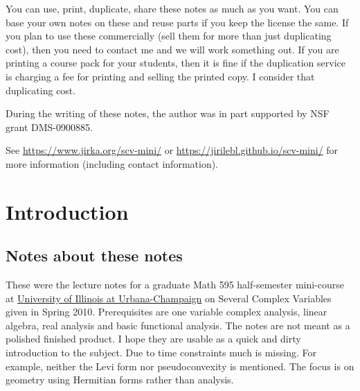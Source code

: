 \documentclass[12pt,openany]{book}
\theoremstyle{plain}
\theoremstyle{remark}
\theoremstyle{definition}
\theoremstyle{exercise}
\theoremstyle{example}
\begin{document}
\noindent
You can use, print, duplicate, share these notes as much as you want.  You can
base your own notes on these and reuse parts if you keep the license the
same.  If you plan to use these commercially (sell them for more than just
duplicating cost), then you need to contact me and we will work something out.
If you are printing a course pack for your students, then it is fine if the 
duplication service is charging a fee for printing and selling the printed
copy.  I consider that duplicating cost.

\bigskip

\noindent
During the writing of these notes, 
the author was in part supported by NSF grant DMS-0900885.

\bigskip

\noindent
See
\url{https://www.jirka.org/scv-mini/} or
\url{https://jirilebl.github.io/scv-mini/}
for more information (including contact information).



\tableofcontents
{}

\newpage


\chapter*{Introduction}


\section{Notes about these notes}

These were the lecture notes for a graduate Math 595 half-semester
mini-course at \href{http://www.math.uiuc.edu/}{University of Illinois at
Urbana-Champaign} on Several Complex Variables given in Spring 2010.
Prerequisites are one variable complex analysis, linear algebra, real
analysis and basic functional analysis.  The notes are not meant as a
polished finished product.  I hope they are usable as a quick and dirty
introduction to the subject.  Due to time constraints much is missing.  For
example, neither the Levi form nor pseudoconvexity is mentioned.  The focus is
on geometry using Hermitian forms rather than analysis.
\end{document}
